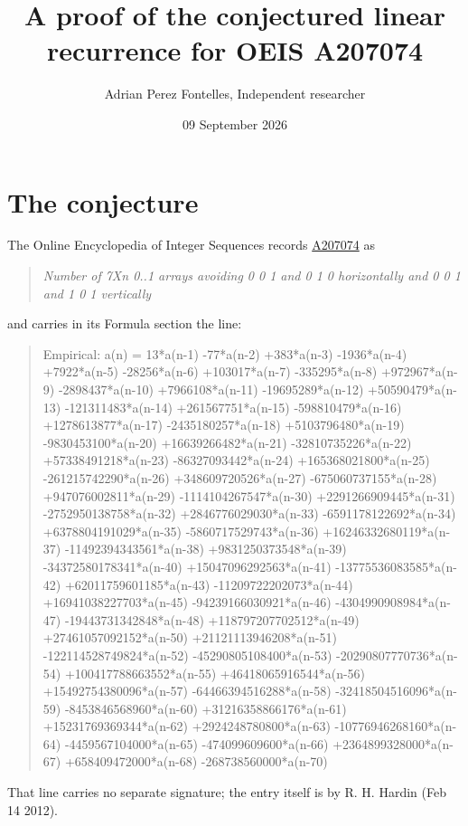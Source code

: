 \documentclass[11pt]{article}
\title{A proof of the conjectured linear recurrence for OEIS A207074}
\author{Adrian Perez Fontelles, Independent researcher}
\date{09 September 2026}
\theoremstyle{definition}
\begin{document}
\maketitle
\section{The conjecture}

The Online Encyclopedia of Integer Sequences records \href{https://oeis.org/A207074}{A207074} as

\begin{quote}\itshape Number of 7Xn 0..1 arrays avoiding 0 0 1 and 0 1 0 horizontally and 0 0 1 and 1 0 1 vertically\end{quote}

and carries in its Formula section the line:

\begin{quote}\ttfamily Empirical: a(n) = 13*a(n-1) -77*a(n-2) +383*a(n-3) -1936*a(n-4) +7922*a(n-5) -28256*a(n-6) +103017*a(n-7) -335295*a(n-8) +972967*a(n-9) -2898437*a(n-10) +7966108*a(n-11) -19695289*a(n-12) +50590479*a(n-13) -121311483*a(n-14) +261567751*a(n-15) -598810479*a(n-16) +1278613877*a(n-17) -2435180257*a(n-18) +5103796480*a(n-19) -9830453100*a(n-20) +16639266482*a(n-21) -32810735226*a(n-22) +57338491218*a(n-23) -86327093442*a(n-24) +165368021800*a(n-25) -261215742290*a(n-26) +348609720526*a(n-27) -675060737155*a(n-28) +947076002811*a(n-29) -1114104267547*a(n-30) +2291266909445*a(n-31) -2752950138758*a(n-32) +2846776029030*a(n-33) -6591178122692*a(n-34) +6378804191029*a(n-35) -5860717529743*a(n-36) +16246332680119*a(n-37) -11492394343561*a(n-38) +9831250373548*a(n-39) -34372580178341*a(n-40) +15047096292563*a(n-41) -13775536083585*a(n-42) +62011759601185*a(n-43) -11209722202073*a(n-44) +16941038227703*a(n-45) -94239166030921*a(n-46) -4304990908984*a(n-47) -19443731342848*a(n-48) +118797207702512*a(n-49) +27461057092152*a(n-50) +21121113946208*a(n-51) -122114528749824*a(n-52) -45290805108400*a(n-53) -20290807770736*a(n-54) +100417788663552*a(n-55) +46418065916544*a(n-56) +15492754380096*a(n-57) -64466394516288*a(n-58) -32418504516096*a(n-59) -8453846568960*a(n-60) +31216358866176*a(n-61) +15231769369344*a(n-62) +2924248780800*a(n-63) -10776946268160*a(n-64) -4459567104000*a(n-65) -474099609600*a(n-66) +2364899328000*a(n-67) +658409472000*a(n-68) -268738560000*a(n-70)\end{quote}

That line carries no separate signature; the entry itself is by R. H. Hardin (Feb 14 2012).
\end{document}

